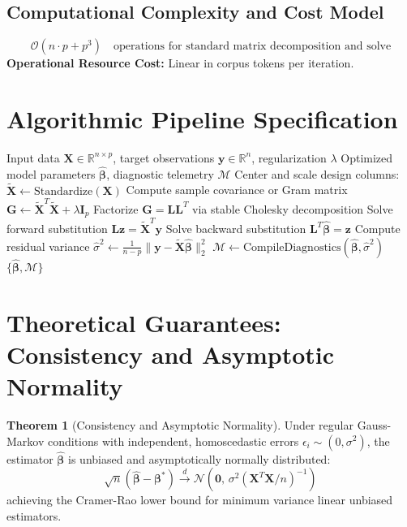 \documentclass[11pt,a4paper]{article}
\theoremstyle{definition}
\newtheorem{theorem}{\textbf{Theorem}}[section]
\begin{document}
\subsection{Computational Complexity and Cost Model}
\begin{equation}
\mathcal{O}(n \cdot p + p^3) \quad \text{operations for standard matrix decomposition and solve}
\end{equation}
\textbf{Operational Resource Cost:} Linear in corpus tokens per iteration.

\section{Algorithmic Pipeline Specification}

\begin{algorithm}[H]
\caption{Latent Dirichlet allocation Execution}
\begin{algorithmic}[1]
\Require Input data $\mathbf{X} \in \mathbb{R}^{n \times p}$, target observations $\mathbf{y} \in \mathbb{R}^n$, regularization $\lambda$
\Ensure Optimized model parameters $\hat{\boldsymbol{\beta}}$, diagnostic telemetry $\mathcal{M}$
\State Center and scale design columns: $\tilde{\mathbf{X}} \gets \text{Standardize}(\mathbf{X})$
\State Compute sample covariance or Gram matrix $\mathbf{G} \gets \tilde{\mathbf{X}}^T \tilde{\mathbf{X}} + \lambda \mathbf{I}_p$
\State Factorize $\mathbf{G} = \mathbf{L} \mathbf{L}^T$ via stable Cholesky decomposition
\State Solve forward substitution $\mathbf{L} \mathbf{z} = \tilde{\mathbf{X}}^T \mathbf{y}$
\State Solve backward substitution $\mathbf{L}^T \hat{\boldsymbol{\beta}} = \mathbf{z}$
\State Compute residual variance $\hat{\sigma}^2 \gets \frac{1}{n - p} \| \mathbf{y} - \tilde{\mathbf{X}} \hat{\boldsymbol{\beta}} \|_2^2$
\State $\mathcal{M} \gets \text{CompileDiagnostics}(\hat{\boldsymbol{\beta}}, \hat{\sigma}^2)$
\State \Return $\{\hat{\boldsymbol{\beta}}, \mathcal{M}\}$
\end{algorithmic}
\end{algorithm}

\section{Theoretical Guarantees: Consistency and Asymptotic Normality}

\begin{theorem}[Consistency and Asymptotic Normality]
Under regular Gauss-Markov conditions with independent, homoscedastic errors $\epsilon_i \sim (0, \sigma^2)$, the estimator $\hat{\boldsymbol{\beta}}$ is unbiased and asymptotically normally distributed:
\begin{equation}
\sqrt{n}(\hat{\boldsymbol{\beta}} - \boldsymbol{\beta}^*) \xrightarrow{d} \mathcal{N}\left(\mathbf{0}, \, \sigma^2 (\mathbf{X}^T \mathbf{X} / n)^{-1}\right)
\end{equation}
achieving the Cramer-Rao lower bound for minimum variance linear unbiased estimators.
\end{theorem}
\end{document}
